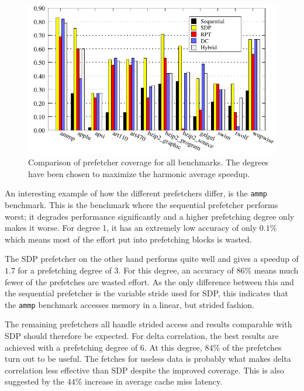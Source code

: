 \begin{figure}
  \centering
  \includegraphics{plots/coverage_overview.pdf}
  \caption{
      Comparison of prefetcher coverage for all benchmarks.
      The degrees have been chosen to maximize the harmonic average speedup.
  }
  \label{fig:coverage}
\end{figure}


An interesting example of how the different prefetchers differ, is the
\texttt{ammp} benchmark.  This is the benchmark where the sequential
prefetcher performs worst; it degrades performance significantly and a
higher prefetching degree only makes it worse.  For degree 1, it has
an extremely low accuracy of only $0.1\%$ which means most of the
effort put into prefetching blocks is wasted.

The SDP prefetcher on the other hand performs quite well and gives a speedup of
$1.7$ for a prefetching degree of $3$. For this degree, an accuracy of $86\%$
means much fewer of the prefetches are wasted effort.  As the only difference
between this and the sequential prefetcher is the variable stride used for SDP,
this indicates that the \texttt{ammp} benchmark accesses memory in a linear,
but strided fashion.

The remaining prefetchers all handle strided access and results comparable with
SDP should therefore be expected.  For delta correlation, the best results are
achieved with a prefetching degree of $6$.  At this degree, $84\%$ of the
prefetches turn out to be useful.  The fetches for useless data is probably
what makes delta correlation less effective than SDP despite the improved
coverage.
This is also suggested by the $44\%$ increase in average cache miss latency.

